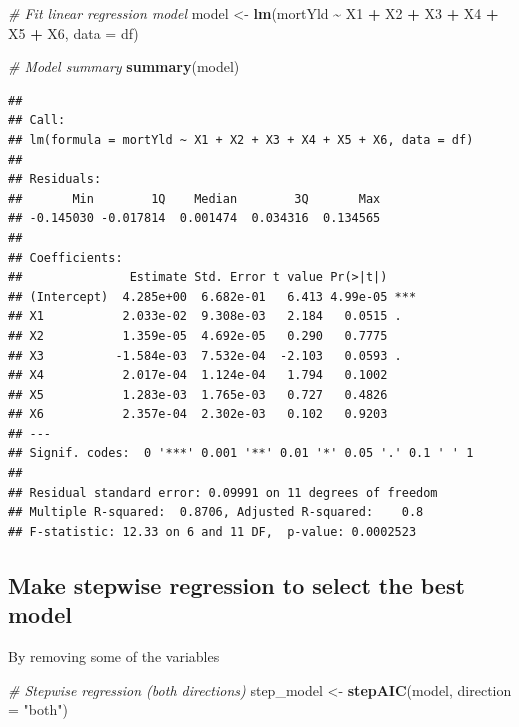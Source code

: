 \documentclass[
  12pt,
]{article}
\newenvironment{Shaded}{\begin{snugshade}}{\end{snugshade}}
\newcommand{\AttributeTok}[1]{\textcolor[rgb]{0.13,0.29,0.53}{#1}}
\newcommand{\CommentTok}[1]{\textcolor[rgb]{0.56,0.35,0.01}{\textit{#1}}}
\newcommand{\FunctionTok}[1]{\textcolor[rgb]{0.13,0.29,0.53}{\textbf{#1}}}
\newcommand{\NormalTok}[1]{#1}
\newcommand{\OtherTok}[1]{\textcolor[rgb]{0.56,0.35,0.01}{#1}}
\newcommand{\SpecialCharTok}[1]{\textcolor[rgb]{0.81,0.36,0.00}{\textbf{#1}}}
\newcommand{\StringTok}[1]{\textcolor[rgb]{0.31,0.60,0.02}{#1}}
\begin{document}
\begin{Shaded}
\begin{Highlighting}[]
\CommentTok{\# Fit linear regression model}
\NormalTok{model }\OtherTok{\textless{}{-}} \FunctionTok{lm}\NormalTok{(mortYld }\SpecialCharTok{\textasciitilde{}}\NormalTok{ X1 }\SpecialCharTok{+}\NormalTok{ X2 }\SpecialCharTok{+}\NormalTok{ X3 }\SpecialCharTok{+}\NormalTok{ X4 }\SpecialCharTok{+}\NormalTok{ X5 }\SpecialCharTok{+}\NormalTok{ X6, }\AttributeTok{data =}\NormalTok{ df)}

\CommentTok{\# Model summary}
\FunctionTok{summary}\NormalTok{(model)}
\end{Highlighting}
\end{Shaded}

\begin{verbatim}
## 
## Call:
## lm(formula = mortYld ~ X1 + X2 + X3 + X4 + X5 + X6, data = df)
## 
## Residuals:
##       Min        1Q    Median        3Q       Max 
## -0.145030 -0.017814  0.001474  0.034316  0.134565 
## 
## Coefficients:
##               Estimate Std. Error t value Pr(>|t|)    
## (Intercept)  4.285e+00  6.682e-01   6.413 4.99e-05 ***
## X1           2.033e-02  9.308e-03   2.184   0.0515 .  
## X2           1.359e-05  4.692e-05   0.290   0.7775    
## X3          -1.584e-03  7.532e-04  -2.103   0.0593 .  
## X4           2.017e-04  1.124e-04   1.794   0.1002    
## X5           1.283e-03  1.765e-03   0.727   0.4826    
## X6           2.357e-04  2.302e-03   0.102   0.9203    
## ---
## Signif. codes:  0 '***' 0.001 '**' 0.01 '*' 0.05 '.' 0.1 ' ' 1
## 
## Residual standard error: 0.09991 on 11 degrees of freedom
## Multiple R-squared:  0.8706, Adjusted R-squared:    0.8 
## F-statistic: 12.33 on 6 and 11 DF,  p-value: 0.0002523
\end{verbatim}

\subsection{Make stepwise regression to select the best
model}\label{make-stepwise-regression-to-select-the-best-model}

By removing some of the variables

\begin{Shaded}
\begin{Highlighting}[]
\CommentTok{\# Stepwise regression (both directions)}
\NormalTok{step\_model }\OtherTok{\textless{}{-}} \FunctionTok{stepAIC}\NormalTok{(model, }\AttributeTok{direction =} \StringTok{"both"}\NormalTok{)}
\end{Highlighting}
\end{Shaded}
\end{document}
